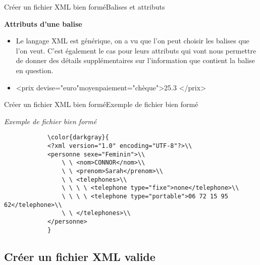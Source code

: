 \documentclass{beamer}
\begin{document}
\begin{frame}{Créer un fichier XML bien formé}{Balises et attributs}
\begin{block}{\textbf{Attributs d'une balise}}
    \begin{itemize}
        \item{
Le langage XML est générique, on a vu que l'on peut choisir les balises que l'on veut. C'est également le cas pour leurs attributs qui vont nous permettre de donner des détails supplémentaires sur l'information que contient la balise en question.}\pause
        \item{
        \textless prix devise="euro"moyenpaiement="chèque"\textgreater 25.3 \textless/prix\textgreater
        }
    \end{itemize}
\end{block}
\end{frame}


\begin{frame}{Créer un fichier XML bien formé}{Exemple de fichier bien formé}
    \begin{block}{\textit{Exemple de fichier bien formé} }
        \begin{verbatim}
            \color{darkgray}{
            <?xml version="1.0" encoding="UTF-8"?>\\
            <personne sexe="Feminin">\\
                \ \ <nom>CONNOR</nom>\\
                \ \ <prenom>Sarah</prenom>\\
                \ \ <telephones>\\
                \ \ \ \ <telephone type="fixe">none</telephone>\\
                \ \ \ \ <telephone type="portable">06 72 15 95 62</telephone>\\
                \ \ </telephones>\\
            </personne>
            }
        \end{verbatim}
    \end{block}
\end{frame}

\subsection{Créer un fichier XML valide}
\end{document}
